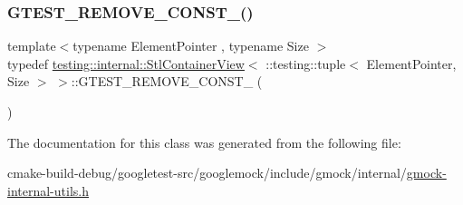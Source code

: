 \mbox{\label{classtesting_1_1internal_1_1StlContainerView_3_01_1_1testing_1_1tuple_3_01ElementPointer_00_01Size_01_4_01_4_a2b1dd06842cb431ef647b85707ce52ff}} 
\subsubsection{\texorpdfstring{GTEST\_REMOVE\_CONST\_()}{GTEST\_REMOVE\_CONST\_()}}
{\footnotesize\ttfamily template$<$typename Element\+Pointer , typename Size $>$ \\
typedef \mbox{\hyperlink{classtesting_1_1internal_1_1StlContainerView}{testing\+::internal\+::\+Stl\+Container\+View}}$<$ \+::testing\+::tuple$<$ Element\+Pointer, Size $>$ $>$\+::G\+T\+E\+S\+T\+\_\+\+R\+E\+M\+O\+V\+E\+\_\+\+C\+O\+N\+S\+T\+\_\+ (\begin{DoxyParamCaption}\item[{typename \mbox{\hyperlink{structtesting_1_1internal_1_1PointeeOf}{internal\+::\+Pointee\+Of}}$<$ Element\+Pointer $>$\+::\mbox{\hyperlink{classtesting_1_1internal_1_1StlContainerView_3_01_1_1testing_1_1tuple_3_01ElementPointer_00_01Size_01_4_01_4_aedefb897170f76518afbca6f87b5467c}{type}}}]{ }\end{DoxyParamCaption})}



The documentation for this class was generated from the following file\+:\begin{DoxyCompactItemize}
\item 
cmake-\/build-\/debug/googletest-\/src/googlemock/include/gmock/internal/\mbox{\hyperlink{gmock-internal-utils_8h}{gmock-\/internal-\/utils.\+h}}\end{DoxyCompactItemize}
